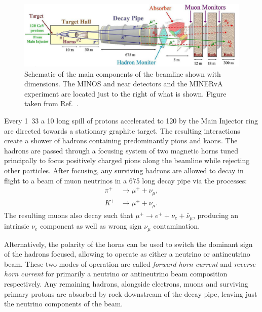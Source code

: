 \begin{figure} %
    \includegraphics[width=\textwidth]{diagrams/4-chips/numi_beam.pdf}
    \caption[Schematic of the main components of the \numi beam]
    {Schematic of the main components of the \numi beamline shown with dimensions. The MINOS and
        \nova near detectors and the MINERvA experiment are located just to the right of what is
        shown. Figure taken from Ref.~\cite{adamson2016}.}
    \label{fig:numi_beam}
\end{figure}

Every \unit{1.33}{} a \unit{10}{\micro{}} long spill of protons accelerated to
\unit{120}{\GeV} by the Main Injector ring are directed towards a stationary graphite target. The
resulting interactions create a shower of hadrons containing predominantly pions and kaons. The
hadrons are passed through a focusing system of two magnetic horns tuned principally to focus
positively charged pions along the beamline while rejecting other particles. After focusing, any
surviving hadrons are allowed to decay in flight to a beam of muon neutrinos in a
\unit{675}{} long decay pipe via the processes:
\begin{align} %
    \pi^{+} & \rightarrow\mu^{+}+\nu_{\mu}, \label{eq:pi_decays}   \\
    K^{+}   & \rightarrow\mu^{+}+\nu_{\mu}. \label{eq:kaon_decays}
\end{align}
The resulting muons also decay such that $\mu^{+}\rightarrow e^{+}+\nu_{e}+\bar{\nu}_{\mu}$,
producing an intrinsic $\nu_{e}$ component as well as wrong sign $\nu_{\mu}$ contamination.

Alternatively, the polarity of the horns can be used to switch the dominant sign of the hadrons
focused, allowing \numi to operate as either a neutrino or antineutrino beam. These two modes of
operation are called \emph{forward horn current} and \emph{reverse horn current} for primarily a
neutrino or antineutrino beam composition respectively. Any remaining hadrons, alongside
electrons, muons and surviving primary protons are absorbed by rock downstream of the decay pipe,
leaving just the neutrino components of the beam.


